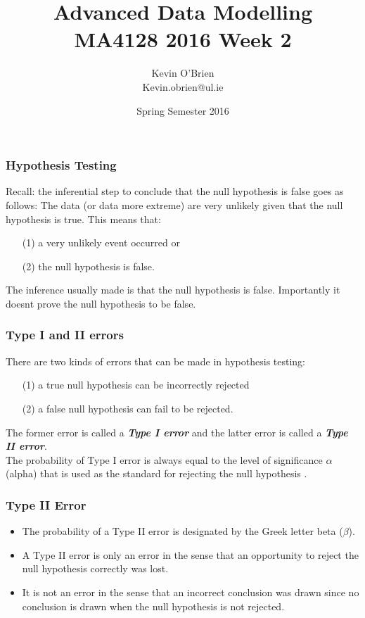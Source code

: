 \documentclass[a4]{beamer}
\title[MA4128]{Advanced Data Modelling \\ {\normalsize MA4128 2016 Week 2}}
\author[Kevin O'Brien]{Kevin O'Brien \\ {\scriptsize Kevin.obrien@ul.ie}}
\date{Spring Semester 2016}
\institute[Maths \& Stats]{Dept. of Mathematics \& Statistics, \\ University \textit{of} Limerick}
\begin{document}
\begin{frame}
\titlepage
\end{frame}

\begin{frame}
	\frametitle{Hypothesis Testing}
	\large
	Recall: the inferential step to conclude that the null hypothesis is false goes as follows: The data (or data more extreme) are very unlikely given that the null hypothesis is true.
	\bigskip
	This means that:
	\begin{itemize}\item [(1)] a very unlikely event occurred or
		\item[(2)] the null hypothesis is false. \end{itemize}
	The inference usually made is that the null hypothesis is false. Importantly it doesnt prove the null hypothesis to be false.
\end{frame}
\begin{frame}
	\frametitle{Type I and II errors}
	\large
	There are two kinds of errors that can be made in hypothesis testing:
	\begin{itemize}
		\item[(1)] a true null hypothesis can be incorrectly rejected
		\item[(2)] a false null hypothesis can fail to be rejected.
	\end{itemize}
	The former error is called a \textbf{\emph{Type I error}} and the latter error is called a \textbf{\emph{Type II error}}. \\ \bigskip
	The probability of Type I error is always equal to the level of significance $\alpha$ (alpha) that is used as the standard for rejecting the null hypothesis .
\end{frame}
\begin{frame}
	\frametitle{Type II Error}
	\begin{itemize}
		
		\item The probability of a Type II error is designated by the Greek letter beta ($\beta$).
		\item A Type II error is only an error in the sense that an opportunity to reject the null hypothesis correctly was lost.
		\item It is not an error in the sense that an incorrect conclusion was drawn since no conclusion is drawn when the null hypothesis is not rejected.
	\end{itemize}
\end{frame}
\end{document}
